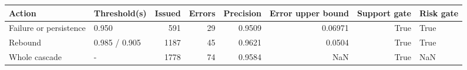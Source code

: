 \begin{tabular}{llrrrrrl}
\toprule
Action & Threshold(s) & Issued & Errors & Precision & Error upper bound & Support gate & Risk gate \\
\midrule
Failure or persistence & 0.950 & 591 & 29 & 0.9509 & 0.06971 & True & True \\
Rebound & 0.985 / 0.905 & 1187 & 45 & 0.9621 & 0.0504 & True & True \\
Whole cascade & - & 1778 & 74 & 0.9584 & NaN & True & NaN \\
\bottomrule
\end{tabular}
